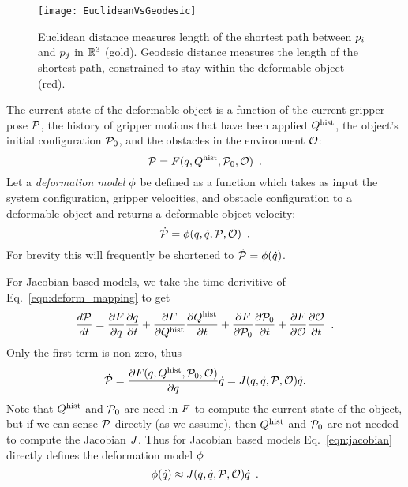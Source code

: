 \begin{figure}[t]
    \centering
    \texttt{[image: EuclideanVsGeodesic]}
    \caption{Euclidean distance measures length of the shortest path between $p_i$ and $p_j$ in $\mathbb{R}^3$ (gold). Geodesic distance measures the length of the shortest path, constrained to stay within the deformable object (red).}
    \label{fig:geodesic}
\end{figure}

The current state of the deformable object is a function of the current gripper pose $\mathcal{P}$, the history of gripper motions that have been applied $Q^{\textrm{hist}}$, the object's initial configuration $\mathcal{P}_0$, and the obstacles in the environment $\mathcal{O}$:
\begin{equation}
    \mathcal{P} = F(q, Q^{\textrm{hist}}, \mathcal{P}_0, \mathcal{O}) \enspace.
    \label{eqn:deform_mapping}
\end{equation}
Let a \textit{deformation model} $\phi$ be defined as a function which takes as input the system configuration, gripper velocities, and obstacle configuration to a deformable object and returns a deformable object velocity:
\begin{equation}
    \dot{\mathcal{P}} = \phi(q, \dot{q}, \mathcal{P}, \mathcal{O}) \enspace .
\end{equation}
For brevity this will frequently be shortened to $\dot{\mathcal{P}} = \phi(\dot{q})$.

For Jacobian based models, we take the time derivitive of Eq.~\eqref{eqn:deform_mapping} to get
\begin{equation}
\frac{d \mathcal{P}}{d t} = 
    \frac{\partial F}{\partial q}  \frac{\partial q}{\partial t} + 
    \frac{\partial F}{\partial Q^{\textrm{hist}}}\frac{\partial Q^{\textrm{hist}}}{\partial t} + 
    \frac{\partial F}{\partial \mathcal{P}_0} \frac{\partial \mathcal{P}_0}{\partial t} +
    \frac{\partial F}{\partial \mathcal{O}}       \frac{\partial \mathcal{O}}{\partial t} \enspace .
\end{equation}
Only the first term is non-zero, thus
\begin{equation}
    \dot{\mathcal{P}} = \frac{\partial F(q, Q^{\textrm{hist}}, \mathcal{P}_0, \mathcal{O})}{\partial q} \dot{q} = J(q, \dot{q}, \mathcal{P}, \mathcal{O}) \dot{q}.
    \label{eqn:jacobian}
\end{equation}
Note that $Q^{\textrm{hist}}$ and $\mathcal{P}_0$ are need in $F$ to compute the current state of the object, but if we can sense $\mathcal{P}$ directly (as we assume), then $Q^{\textrm{hist}}$ and $\mathcal{P}_0$ are not needed to compute the Jacobian $J$. Thus for Jacobian based models Eq.~\eqref{eqn:jacobian} directly defines the deformation model $\phi$
\begin{equation}
    \phi(\dot{q}) \approx J(q, \dot{q}, \mathcal{P}, \mathcal{O}) \dot{q} \enspace.
    \label{eqn:jacobianforwardfunction}
\end{equation}

